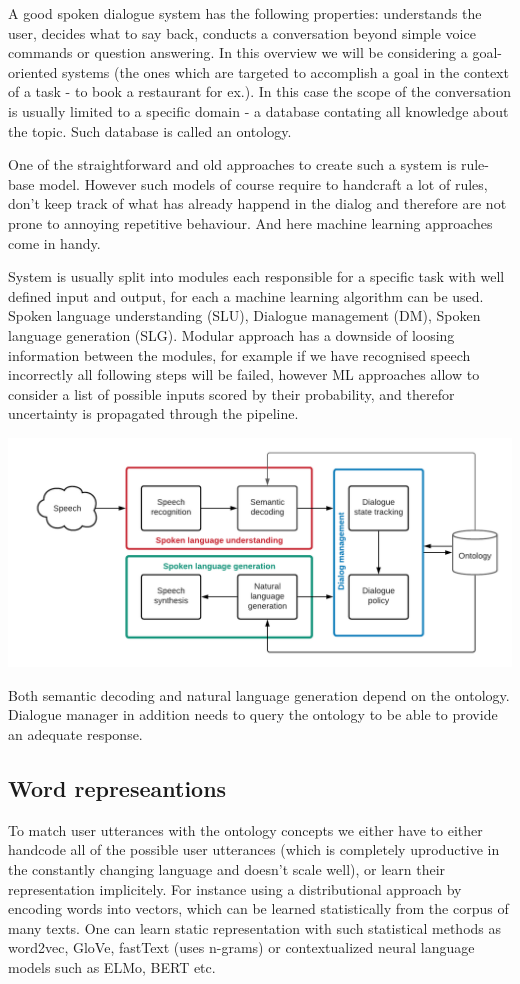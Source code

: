 \documentclass[12pt,titlepage,a4paper]{article}
\begin{document}
A good spoken dialogue system has the following properties: understands the user, decides what to say back, conducts a conversation beyond simple vo\-ice commands or question answering. 
In this overview we will be considering a goal-oriented systems (the ones which are targeted to accomplish a goal in the context of a task - to book a restaurant for ex.). In this case the scope of the conversation is usually limited to a specific domain - a database contating all knowledge about the topic. Such database is called an ontology.
\par
One of the straightforward and old approaches to create such a system is rule-base model. However such models of course require to handcraft a lot of rules, don't keep track of what has already happend in the dialog and therefore are not prone to annoying repetitive behaviour. And here machine learning approaches come in handy. \par

System is usually split into modules each responsible for a specific task with well defined input and output, for each a machine learning algorithm can be used. Spoken language understanding (SLU), Dialogue management (DM), Spoken language generation (SLG). Modular approach has a downside of loosing information between the modules, for example if we have recognised speech incorrectly all following steps will be failed, however ML approaches allow to consider a list of possible inputs scored by their probability, and therefor uncertainty is propagated through the pipeline. \par
\includegraphics[width=\linewidth]{SDS-main.png}

Both semantic decoding and natural language generation depend on the ontology. Dialogue manager in addition needs to query the ontology to be able to provide an adequate response.

\subsection{Word represeantions}
To match user utterances with the ontology concepts we either have to either handcode all of the possible user utterances (which is completely uproductive in the constantly changing language and doesn't scale well), or learn their representation implicitely. For instance using a distri\-butional approach by encoding words into vectors, which can be learned statistically from the corpus of many texts. One can learn static representation with such statistical methods as word2vec, GloVe, fastText (uses n-grams) or contextualized neural language models such as ELMo, BERT etc.
\end{document}
